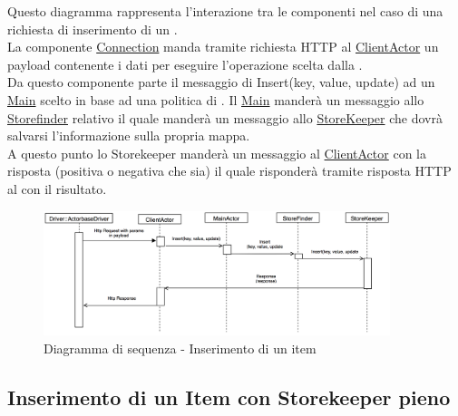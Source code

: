 \documentclass{scalatekids-article}
\begin{document}
Questo diagramma rappresenta l'interazione tra le componenti nel caso di una richiesta di inserimento di un .\\
La componente \hyperref[sec:actorbase::driver::client::Connection]{Connection}
manda tramite richiesta HTTP al \hyperref[sec:actorbase::actorsystem::actors::clientactor::ClientActor]{ClientActor}
un payload contenente i dati per eseguire l'operazione scelta dalla .\\
Da questo componente parte il messaggio di Insert(key, value, update) ad un \hyperref[sec:actorbase::actorsystem::actors::main::Main]{Main} scelto in base ad una
politica di . Il \hyperref[sec:actorbase::actorsystem::actors::main::Main]{Main} manderà un messaggio allo \hyperref[sec:actorbase::actorsystem::actors::storefinder::Storefinder]{Storefinder} relativo il quale manderà un messaggio allo \hyperref[sec:actorbase::actorsystem::actors::storekeeper::StoreKeeper]{StoreKeeper} che dovrà salvarsi l'informazione
sulla propria mappa.\\
A questo punto lo Storekeeper manderà un messaggio al \hyperref[sec:actorbase::actorsystem::actors::clientactor::ClientActor]{ClientActor} con la risposta
(positiva o negativa che sia) il quale risponderà tramite risposta HTTP al  con il risultato.
\begin{figure}[H]
  \begin{center}
    \includegraphics[width=0.9\textwidth, keepaspectratio]{img/diagrammiSequenza/esempioInsert.png}
    \caption{Diagramma di sequenza - Inserimento di un item}
  \end{center}
\end{figure}

\subsection{Inserimento di un Item con Storekeeper pieno}
\end{document}
